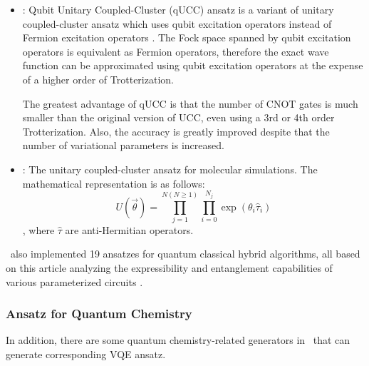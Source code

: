 \begin{itemize}
    \item \QubitUCCAnsatz: Qubit Unitary Coupled-Cluster (qUCC) ansatz is a variant of unitary coupled-cluster ansatz which uses qubit excitation operators instead of Fermion excitation operators \cite{PhysRevA.102.062612}. The Fock space spanned by qubit excitation operators is equivalent as Fermion operators, therefore the exact wave function can be approximated using qubit excitation operators at the expense of a higher order of Trotterization.

          The greatest advantage of qUCC is that the number of CNOT gates is much smaller than the original version of UCC, even using a 3rd or 4th order Trotterization. Also, the accuracy is greatly improved despite that the number of variational parameters is increased.

    \item \UCCAnsatz: The unitary coupled-cluster ansatz for molecular simulations. The mathematical representation is as follows:
          $$U(\vec{\theta}) = \prod_{j=1}^{N(N\ge1)}{\prod_{i=0}^{N_{j}}{\exp{(\theta_{i}\hat{\tau}_{i})}}}$$,
          where $\hat{\tau}$ are anti-Hermitian operators.
\end{itemize}

\MindQuantum \ also implemented 19 ansatzes for quantum classical hybrid algorithms, all based on this article analyzing the expressibility and entanglement capabilities of various parameterized circuits \cite{Sim_2019}.

\subsubsection{Ansatz for Quantum Chemistry}

In addition, there are some quantum chemistry-related generators in \MindQuantum \ that can generate corresponding VQE ansatz.

